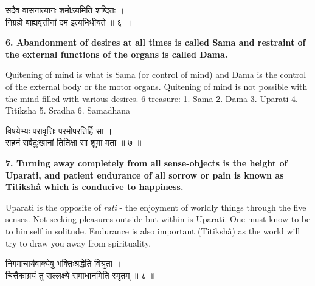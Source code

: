 \documentclass{article}
\begin{document}
\begin{large}
\begin{center}
    \begin{hindi}
	सदैव वासनात्यागः शमोऽयमिति शब्दितः ।\\
	निग्रहो बाह्यवृत्तीनां दम इत्यभिधीयते ॥ ६ ॥
    \end{hindi}
\end{center}
\end{large}

\textbf{6. Abandonment of desires at all times is called Sama and restraint
of the external functions of the organs is called Dama.
}

\begin{oframed}
Quitening of mind is what is Sama (or control of mind) and Dama is the control
of the external body or the motor organs. Quitening of mind is not possible
with the mind filled with various desires.
6 treasure: 
1. Sama
2. Dama
3. Uparati
4. Titiksha
5. Sradha
6. Samadhana
\end{oframed}

\begin{large}
\begin{center}
    \begin{hindi}
	विषयेभ्यः परावृत्तिः परमोपरतिर्हि सा ।\\
	सहनं सर्वदुःखानां तितिक्षा सा शुमा मता ॥ ७ ॥
    \end{hindi}
\end{center}
\end{large}

\textbf{
7. Turning away completely from all sense-objects is the height of Uparati,
and patient endurance of all sorrow or pain is known as Titikshâ which is
conducive to happiness.
}

\begin{oframed}
Uparati is the opposite of \textsl{rati} - the enjoyment of worldly things
through the five senses. Not seeking pleasures outside but within is Uparati.
One must know to be to himself in solitude. Endurance is also important
(Titikshâ) as the world will try to draw you away from spirituality.
\end{oframed}



\begin{large}
\begin{center}
    \begin{hindi}
	निगमाचार्यवाक्येषु भक्तिःश्रद्धेति विश्रुता ।\\
	चित्तैकाग्रयं तु सल्लक्ष्ये समाधानमिति स्मृतम् ॥ ८ ॥
    \end{hindi}
\end{center}
\end{large}
\end{document}
